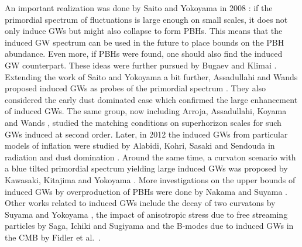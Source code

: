 \documentclass[a4paper,11pt]{article}
\numberwithin{equation}{section}
\begin{document}
An important realization was done by Saito and Yokoyama in 2008 \cite{Saito:2008jc,Saito:2009jt}: if the primordial spectrum of fluctuations is large enough on small scales, it does not only induce GWs but might also collapse to form PBHs. This means that the induced GW spectrum can be used in the future to place bounds on the PBH abundance. Even more, if PBHs were found, one should also find the induced GW counterpart. These ideas were further pursued by Bugaev and Klimai \cite{Bugaev:2009zh,Bugaev:2009kq,Bugaev:2010bb}. Extending the work of Saito and Yokoyama a bit further, Assadullahi and Wands proposed induced GWs as probes of the primordial spectrum \cite{Assadullahi:2009jc}. They also considered the early dust dominated case \cite{Assadullahi:2009nf} which confirmed the large enhancement of induced GWs. The same group, now including Arroja, Assadullahi, Koyama and Wands \cite{Arroja:2009sh}, studied the matching conditions on superhorizon scales for such GWs induced at second order. Later, in 2012 the induced GWs from particular models of inflation were studied by Alabidi, Kohri, Sasaki and Sendouda in radiation \cite{Alabidi:2012ex} and dust domination \cite{Alabidi:2013lya}. Around the same time, a curvaton scenario with a blue tilted primordial spectrum yielding large induced GWs was proposed by Kawasaki, Kitajima and Yokoyama \cite{Kawasaki:2013xsa}. More investigations on the upper bounds of induced GWs by overproduction of PBHs were done by Nakama and Suyama \cite{Nakama:2015nea,Nakama:2016enz}. Other works related to induced GWs include the decay of two curvatons by Suyama and Yokoyama \cite{Suyama:2011pu}, the impact of anisotropic stress due to free streaming particles by Saga, Ichiki and Sugiyama \cite{Saga:2014jca} and the B-modes due to induced GWs in the CMB by Fidler et al.~\cite{Fidler:2014oda}.
\end{document}
